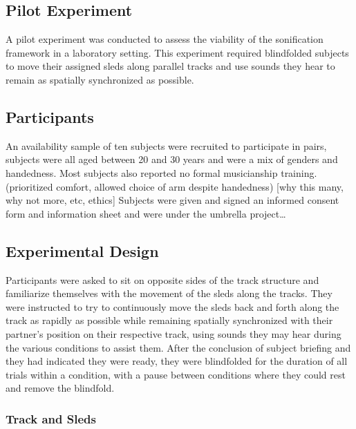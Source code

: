 \documentclass[10pt,a4paper,onecolumn]{article}
\begin{document}
\hypertarget{pilot-experiment}{%
\subsection{Pilot Experiment}\label{pilot-experiment}}

A pilot experiment was conducted to assess the viability of the sonification framework in a laboratory setting. This experiment required blindfolded subjects to move their assigned sleds along parallel tracks and use sounds they hear to remain as spatially synchronized as possible.

\hypertarget{participants}{%
\subsection{Participants}\label{participants}}

An availability sample of ten subjects were recruited to participate in pairs, subjects were all aged between 20 and 30 years and were a mix of genders and handedness. Most subjects also reported no formal musicianship training. (prioritized comfort, allowed choice of arm despite handedness) {[}why this many, why not more, etc, ethics{]} Subjects were given and signed an informed consent form and information sheet and were under the umbrella project\ldots{}

\hypertarget{experimental-design}{%
\subsection{Experimental Design}\label{experimental-design}}

Participants were asked to sit on opposite sides of the track structure and familiarize themselves with the movement of the sleds along the tracks. They were instructed to try to continuously move the sleds back and forth along the track as rapidly as possible while remaining spatially synchronized with their partner's position on their respective track, using sounds they may hear during the various conditions to assist them. After the conclusion of subject briefing and they had indicated they were ready, they were blindfolded for the duration of all trials within a condition, with a pause between conditions where they could rest and remove the blindfold.

\hypertarget{track-and-sleds}{%
\subsubsection{Track and Sleds}\label{track-and-sleds}}
\end{document}
